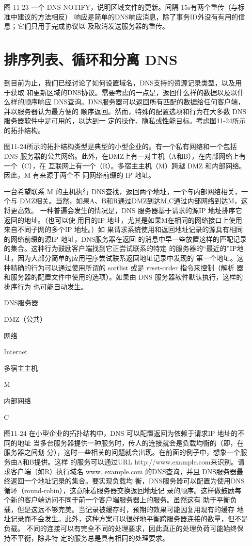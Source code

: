 图 11-23
一个 DNS NOTIFY，说明区域文件的更新。间隔 15s有两个重传（与标准中建议的方法相反）
响应是简单的DNS响应消息，除了事务ID外没有有用的信息；它们只用于完成协议以
及取消发送服务器的重传。

\section{排序列表、循环和分离 DNS}

到目前为止，我们已经讨论了如何设置域名，DNS支持的资源记录类型，以及用于获取
和更新区域的DNS协议。需要考虑的一点是，返回什么样的数据以及以什么样的顺序响应
DNS查询。DNS服务器可以返回所有匹配的数据给任何客户端，并以服务器认为最方便的
顺序返回。然而，特殊的配置选项和行为在大多数 DNS服务器软件中是可用的，以达到一
定的操作、隐私或性能目标。考虑图11-24所示的拓扑结构。

图11-24所示的拓扑结构类型是典型的小型企业的。有一个私有网络和一个包括 DNS
服务器的公共网络。此外，在DMZ上有一对主机（A和B），在内部网络上有一个（C），在
互联网上有一个（R）。多宿主主机（M）跨越 DMZ 和内部网络。因此，M 有来源于两个不
同网络前缀的 IP 地址。

一台希望联系 M 的主机执行 DNS查找，返回两个地址，一个与内部网络相关，一个与
DMZ相关。当然，如果A、B和R通过DMZ到达M,C通过内部网络到达M，这将更高效。
一种普遍会发生的情况是，DNS 服务器基于请求的源IP 地址排序它返回的地址。（也可以使
用目的IP 地址，尤其是如果M在相同的网络接口上使用来自不同子网的多个IP 地址。）如
果请求系统使用和返回地址记录的源具有相同的网络前缀的源IP 地址，DNS服务器在返回
的消息中早一些放置这样的匹配记录的集合。这种行为鼓励客户端找到它正尝试联系的特定
的服务器的“最近的”IP地址，因为大部分简单的应用程序尝试联系返回地址记录中发现的
第一个地址。这种精确的行为可以通过使用所谓的 sortlist 或是 rrset-order 指令来控制（解析
器和服务器的配置文件中使用的选项）。如果由 DNS 服务器软件默认执行，这样的排序行为
也可能自动发生。

DNS服务器

DMZ（公共）

网络

Internet

多宿主主机

M

内部网络

C

图11-24 在小型企业的拓扑结构中，DNS 可以配置返回为依赖于请求IP 地址的不同的地址
当多台服务器提供一种服务时，传人的连接就会是负载均衡的（即，在服务器之间划
分），这时一些相关的问题就会出现。在前面的例子中，想象一个服务由A和B提供。这样
的服务可以通过URL http://www.example.com来识别。请求客户端（如R）执行域名 www.
example.com 的DNS查询，并且 DNS服务器最终返回一个地址记录的集合。要实现负载均
衡，DNS服务器可以配置为使用DNS循环（round-robin），这意味着服务器交换返回地址记
录的顺序。这样做鼓励每个新的客户端访问不同于前一个客户端服务器上的服务。虽然这有
助于平衡负载，但是这远不够完美。当记录被缓存时，预期的效果可能因复用现有的缓存
地址记录而不会发生。此外，这种方案可以很好地平衡跨服务器连接的数量，但不是负载。
不同的连接可以有完全不同的处理要求，因此真正的处理负荷可能始终保持不平衡，除非特
定的服务总是具有相同的处理要求。


